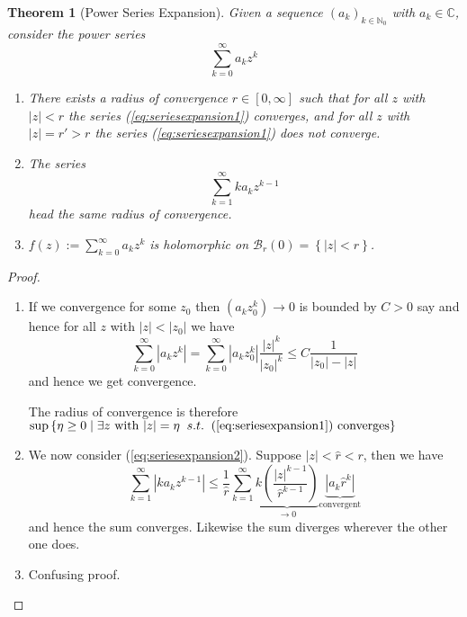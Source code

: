 \documentclass[11pt]{article}
\newcommand{\defeq}{:=}
\newcommand{\abs}[1]{|#1|}
\newcommand{\relmiddle}[1]{\mathrel{}\middle#1\mathrel{}}
\newcommand{\rmv}{\relmiddle|}
\newcommand{\C}{\mathbb{C}}
\newcommand{\N}{\mathbb{N}}
\newcommand{\mdf}[1]{{\color{red} #1}}
\newtheorem{theorem}{Theorem}[section]
\begin{document}
\begin{theorem}[Power Series Expansion]
Given a sequence $(a_k)_{k\in\N_0}$ with $a_k\in\C$, consider the power series
\begin{equation}
	\sum_{k=0}^{\infty}a_k z^k	
	\label{eq:seriesexpansion1}
\end{equation}
\begin{enumerate}[label=(\alph*)]
	\item There exists a \mdf{radius of convergence} $r\in [0,\infty]$ such that for all $z$ with $\abs{z}<r$ the series (\ref{eq:seriesexpansion1}) converges, and for all $z$ with $\abs{z}=r' > r$ the series (\ref{eq:seriesexpansion1}) does not converge.
	\item The series
		\begin{equation}
			\sum_{k=1}^{\infty}k a_k z^{k-1}
			\label{eq:seriesexpansion2}
		\end{equation}
		head the same radius of convergence.
	\item $f(z)\defeq\sum_{k=0}^{\infty}a_k z^k$ is holomorphic on $\mathcal{B}_r(0)=\left\{\abs{z}< r\right\}$.
\end{enumerate}
\end{theorem}

\begin{proof}
\begin{enumerate}[label=(\alph*)]
	\item If we convergence for some $z_0$ then $(a_kz_0^k)\to 0$ is bounded by $C>0$ say and hence for all $z$ with $\abs{z}<\abs{z_0}$ we have
		\[
			\sum_{k=0}^{\infty}\abs{a_kz^k}=\sum_{k=0}^{\infty}\abs{a_k z_0^k}\frac{\abs{z}^k}{\abs{z_0}^k}\leq C \frac{1}{\abs{z_0}-\abs{z}}
		\]
		and hence we get convergence.
		
		The radius of convergence is therefore $\sup\left\{\eta \geq 0 \rmv \exists z \text{ with }\abs{z}=\eta \;\; s.t. \;\; (\ref{eq:seriesexpansion1}) \text{ converges}\right\}$
	\item We now consider (\ref{eq:seriesexpansion2}).
		Suppose $\abs{z}<\hat{r} < r$, then we have
		\[
			\sum_{k=1}^{\infty}\abs{ka_k z^{k-1}} \leq \frac{1}{\hat{r}}\sum_{k=1}^{\infty}\underbrace{k\left(\frac{\abs{z}^{k-1}}{\hat{r}^{k-1}}\right)}_{\to 0}\underbrace{\abs{a_k\hat{r}^k}}_{\text{convergent}}
		\]
		and hence the sum converges.
		Likewise the sum diverges wherever the other one does.
	\item Confusing proof.
\end{enumerate}
\end{proof}
\end{document}
